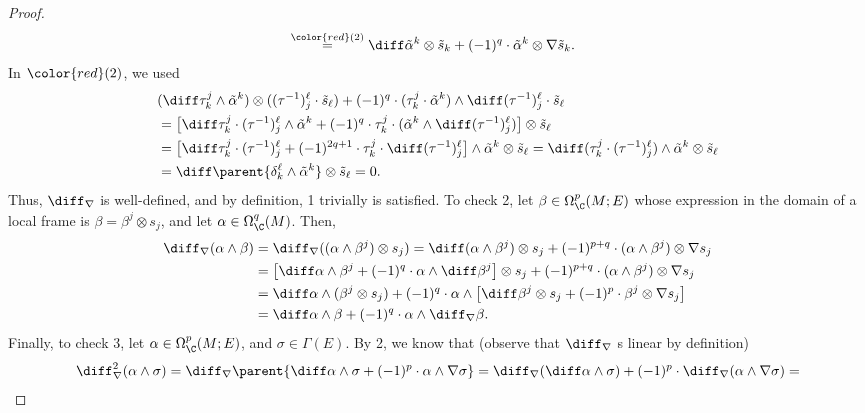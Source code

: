\begin{proof}
\begin{align*}
        & \overset{{\color{red}(2)}}{=} \diff \tilde{\alpha}^k \otimes \tilde{s}_k + (-1)^q \cdot \tilde{\alpha}^k \otimes \nabla \tilde{s}_k.      
    \end{align*}
    In \({\color{red}(2)}\), we used  
    \begin{align*}
        &(\diff \tau^j_k \wedge \tilde{\alpha}^k) \otimes((\tau^{-1})^\ell_j \cdot \tilde{s}_\ell)+ (-1)^q \cdot (\tau^j_k \cdot \tilde{\alpha}^k) \wedge \diff(\tau^{-1})^\ell_j \cdot \tilde{s}_\ell \\
        &= \big[\diff \tau^j_k \cdot (\tau^{-1})^\ell_j \wedge \tilde{\alpha}^k + (-1)^q \cdot \tau^j_k \cdot (\tilde{\alpha}^k \wedge \diff(\tau^{-1})^\ell_j ) \big] \otimes \tilde{s}_\ell \\
        &= \big[ \diff \tau^j_k \cdot (\tau^{-1})^\ell_j+(-1)^{2q+1} \cdot \tau^j_k \cdot \diff(\tau^{-1})^\ell_j \big] \wedge \tilde{\alpha}^k \otimes \tilde{s}_\ell = \diff(\tau^j_k \cdot (\tau^{-1})^\ell_j) \wedge \tilde{\alpha}^k \otimes \tilde{s}_\ell \\& = \diff \parent{\delta^\ell_k\wedge \tilde{\alpha}^k} \otimes \tilde{s}_\ell=0.
    \end{align*}
    Thus, \(\diff_\nabla\) is well-defined, and by definition, 1 trivially is satisfied. To check 2, let \(\beta\in \Omega_\C^p(M;E)\) whose expression in the domain of a local frame is \(\beta=\beta^j\otimes s_j\), and let \(\alpha \in \Omega^q_\C(M)\). Then, 
    \begin{align*}
        \diff_\nabla(\alpha \wedge \beta) & = \diff_\nabla((\alpha\wedge \beta^j) \otimes s_j) = \diff(\alpha \wedge \beta^j) \otimes s_j+(-1)^{p+q} \cdot (\alpha \wedge \beta^j) \otimes \nabla s_j \\
        & =\big[ \diff \alpha \wedge \beta^j + (-1)^q \cdot \alpha \wedge\diff  \beta^j \big] \otimes s_j + (-1)^{p+q} \cdot (\alpha \wedge \beta^j) \otimes\nabla s_j \\
        & = \diff \alpha \wedge (\beta^j \otimes s_j) + (-1)^q \cdot\alpha \wedge  \big[ \diff \beta^j \otimes s_j + (-1)^p \cdot \beta^j \otimes \nabla s_j\big] \\
        & = \diff \alpha \wedge \beta + (-1)^q \cdot \alpha \wedge \diff_\nabla \beta.
    \end{align*}
    Finally, to check 3, let \(\alpha \in \Omega_\C^p(M;E)\), and \(\sigma \in \Gamma(E)\). By 2, we know that (observe that \(\diff_\nabla\) s linear by definition)
    \begin{align*}
        \diff_\nabla^2 (\alpha \wedge \sigma) & =\diff_\nabla \parent{ \diff \alpha \wedge \sigma + (-1)^p \cdot \alpha \wedge \nabla \sigma}= \diff_\nabla(\diff \alpha \wedge \sigma) + (-1)^p \cdot \diff_\nabla (\alpha \wedge \nabla\sigma) = \\

\end{align*}
\end{proof}
